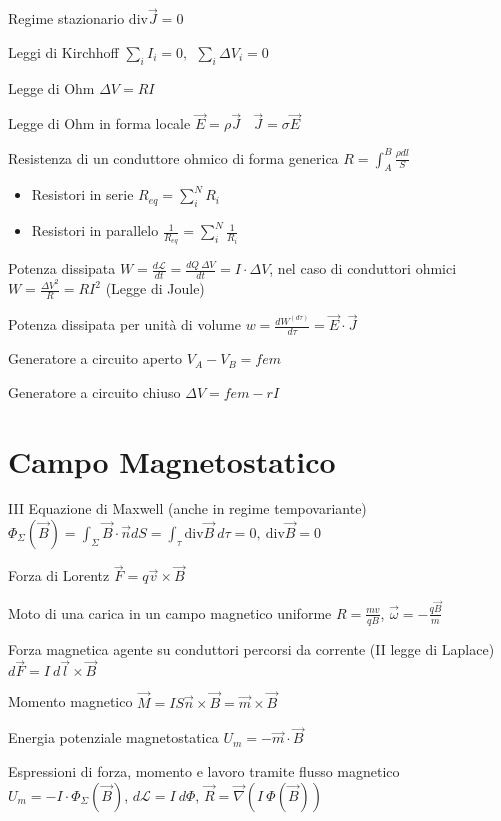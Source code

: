 \documentclass[10pt,a4paper]{article}
\begin{document}
\begin{multicols}{2}
Regime stazionario $\text{div}\vec{J} =0$

Leggi di Kirchhoff $\sum _{i} I_{i} =0,\ \ \sum _{i} \Delta V_{i} =0$

Legge di Ohm $\Delta V=RI$

Legge di Ohm in forma locale $\vec{E} =\rho \vec{J} \ \ \ \ \vec{J} =\sigma \vec{E}$

Resistenza di un conduttore ohmico di forma generica $R=\int ^{B}_{A}\frac{\rho dl}{S}$
\begin{itemize}
\item Resistori in serie $R_{eq} =\sum ^{N}_{i} R_{i}$
\item Resistori in parallelo $\frac{1}{R_{eq}} =\sum ^{N}_{i}\frac{1}{R_{i}}$
\end{itemize}

Potenza dissipata $W=\frac{d\mathcal{L}}{dt} =\frac{dQ\ \Delta V}{dt} =I\cdot \Delta V$, nel caso di conduttori ohmici $W=\frac{\Delta V^{2}}{R} =RI^{2}$ (Legge di Joule)

Potenza dissipata per unità di volume $w=\frac{dW^{(d\tau )}}{d\tau } =\vec{E} \cdot \vec{J}$

Generatore a circuito aperto $V_{A} -V_{B} =fem$

Generatore a circuito chiuso $\Delta V=fem-rI$
\section*{Campo Magnetostatico}

III Equazione di Maxwell (anche in regime tempovariante) \\$\Phi _{\Sigma } (\vec{B} )=\int _{\Sigma }\vec{B} \cdot \vec{n} dS=\int _{\tau }\text{div}\vec{B} \ d\tau =0,\ \text{div}\vec{B} =0$

Forza di Lorentz $\vec{F} =q\vec{v} \times \vec{B}$

Moto di una carica in un campo magnetico uniforme $R=\frac{mv}{qB}$, $\vec{\omega } =-\frac{q\vec{B}}{m}$

Forza magnetica agente su conduttori percorsi da corrente (II legge di Laplace) $d\vec{F} =I\ d\vec{l} \times \vec{B}$

Momento magnetico $\vec{M} =IS\vec{n} \times \vec{B} =\vec{m} \times \vec{B}$

Energia potenziale magnetostatica $U_{m} =-\vec{m} \cdot \vec{B}$

Espressioni di forza, momento e lavoro tramite flusso magnetico $U_{m} =-I\cdot \Phi _{\Sigma } (\vec{B} )$, $d\mathcal{L} =I\ d\Phi $, $\vec{R} =\vec{\nabla } (I\ \Phi (\vec{B} ))$


\end{multicols}
\end{document}
